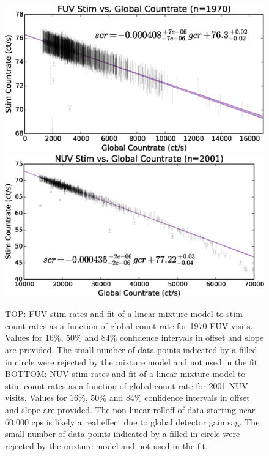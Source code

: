 \documentclass[preprint]{aastex}
\begin{document}
\begin{figure}[t!]
\begin{minipage}[c][11cm][c]{1.\textwidth}
\centering
\includegraphics[scale=0.95]{Fig12a.eps}
\includegraphics[scale=0.90]{Fig12b.eps}
\caption{TOP: FUV stim rates and fit of a linear mixture model to stim count rates as a function of global count rate for 1970 FUV visits. Values for $16\%$, $50\%$ and $84\%$ confidence intervals in offset and slope are provided. The small number of data points indicated by a filled in circle were rejected by the mixture model and not used in the fit.  BOTTOM: NUV stim rates and fit of a linear mixture model to stim count rates as a function of global count rate for 2001 NUV visits. Values for $16\%$, $50\%$ and $84\%$ confidence intervals in offset and slope are provided. The non-linear rolloff of data starting near 60,000 cps is likely a real effect due to global detector gain sag. The small number of data points indicated by a filled in circle were rejected by the mixture model and not used in the fit.
\label{fuvnuvstim}}
\end{minipage}
\end{figure}
\end{document}
